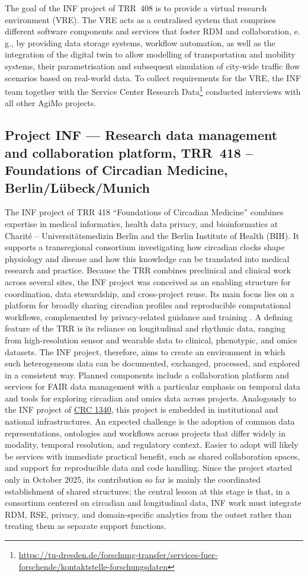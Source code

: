 \documentclass{eceasst}
\newcommand{\eg}{e.\,g.}
\begin{document}
The goal of the INF project of TRR~408 is to provide a virtual research environment (VRE).
The VRE acts as a centralised system that comprises different software components and services that foster RDM and collaboration, \eg, by providing data storage systems, workflow automation, as well as the integration of the digital twin to allow modelling of transportation and mobility systems, their parametrisation and subsequent simulation of city-wide traffic flow scenarios based on real-world data. To collect requirements for the VRE, the INF team together with the Service Center Research Data\footnote{\url{https://tu-dresden.de/forschung-transfer/services-fuer-forschende/kontaktstelle-forschungsdaten}} conducted interviews with all other AgiMo projects.

\subsection{Project INF --- Research data management and collaboration platform, TRR~418 -- Foundations of Circadian Medicine, Berlin/Lübeck/Munich}
The INF project of TRR 418 “Foundations of Circadian Medicine” combines expertise in medical informatics, health data privacy, and bioinformatics at Charité – Universitätsmedizin Berlin and the Berlin Institute of Health (BIH).
It supports a transregional consortium investigating how circadian clocks shape physiology and disease and how this knowledge can be translated into medical research and practice. Because the TRR combines preclinical and clinical work across several sites, the INF project was conceived as an enabling structure for coordination, data stewardship, and cross-project reuse. Its main focus lies on a platform for broadly sharing circadian profiles and reproducible computational workflows, complemented by privacy-related guidance and training \cite{baum_data_circadian_2023}.
A defining feature of the TRR is its reliance on longitudinal and rhythmic data, ranging from high-resolution sensor and wearable data to clinical, phenotypic, and omics datasets.
The INF project, therefore, aims to create an environment in which such heterogeneous data can be documented, exchanged, processed, and explored in a consistent way. Planned components include a collaboration platform and services for FAIR data management with a particular emphasis on temporal data and tools for exploring circadian and omics data across projects.
Analogously to the INF project of \hyperref[sec:sfb1340]{CRC 1340}, this project is embedded in institutional and national infrastructures. An expected challenge is the adoption of common data representations, ontologies and workflows across projects that differ widely in modality, temporal resolution, and regulatory context. Easier to adopt will likely be services with immediate practical benefit, such as shared collaboration spaces, and support for reproducible data and code handling.
Since the project started only in October 2025, its contribution so far is mainly the coordinated establishment of shared structures; the central lesson at this stage is that, in a consortium centered on circadian and longitudinal data, INF work must integrate RDM, RSE, privacy, and domain-specific analytics from the outset rather than treating them as separate support functions.
\end{document}
